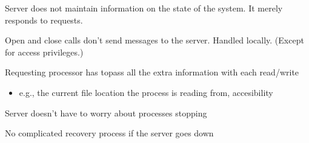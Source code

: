 \begin{slide}


    Server does not maintain information on the state of the system. It merely responds to requests.
    \bigskip

    Open and close calls don’t send messages to the server. Handled locally. (Except for access privileges.)
    \bigskip

    Requesting processor has topass all the extra information with each read/write
    \begin{itemize}
        \item e.g., the current file location the process is reading from, accesibility
    \end{itemize}
    \bigskip

    Server doesn't have to worry about processes stopping
    \bigskip

    No complicated recovery process if the server goes down
    
\end{slide}
    

